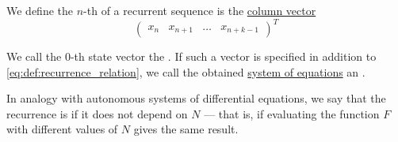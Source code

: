 \begin{definition}
\begin{thmenum}
     We define the \( n \)-th  of a recurrent sequence is the \hyperref[def:array/column_vector]{column vector}
    \begin{equation*}
      \begin{pmatrix}
        x_n & x_{n+1} & \ldots & x_{n+k-1}
      \end{pmatrix}^T
    \end{equation*}

     We call the \( 0 \)-th state vector the . If such a vector is specified in addition to \eqref{eq:def:recurrence_relation}, we call the obtained \hyperref[def:system_of_equations]{system of equations} an .

     In analogy with autonomous systems of differential equations, we say that the recurrence is  if it does not depend on \( N \) --- that is, if evaluating the function \( F \) with different values of \( N \) gives the same result.
  \end{thmenum}
\end{definition}
